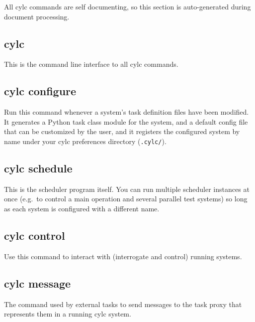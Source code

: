 \documentclass[11pt,a4paper]{article}
\begin{document}
All cylc commands are self documenting, so this section is
auto-generated during document processing.

\subsection{cylc}

\lstset{language=usage}

This is the command line interface to all cylc commands.

{

}

\pagebreak
\subsection{cylc configure}

Run this command whenever a system's task definition files have been
modified. It generates a Python task class module for the system, and a
default config file that can be customized by the user, and it registers
the configured system by name under your cylc preferences directory
(\lstinline=.cylc/=).

{ 
 
}

\pagebreak
\subsection{cylc schedule}

This is the scheduler program itself. You can run multiple scheduler
instances at once (e.g.\ to control a main operation and several
parallel test systems) so long as each system is configured with a
different name. 
{

}

\pagebreak
\subsection{cylc control}

Use this command to interact with (interrogate and control) running systems.

{

}

\pagebreak
\subsection{cylc message}

The command used by external tasks to send messages to the task proxy 
that represents them in a running cylc system.
\end{document}
